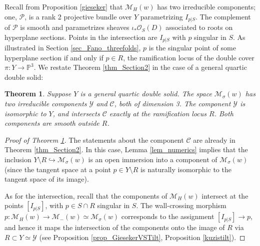 \documentclass[11pt]{amsart}
\newtheorem{thm}{Theorem}[section]
\theoremstyle{definition}
\newcommand{\pr}[1]{\mathbb P^{#1}}
\newcommand{\sO}{\mathcal{O}}
\newcommand{\sY}{\mathcal{Y}}
\newcommand{\sM}{\mathcal{M}}
\newcommand{\sC}{\mathcal{C}}
\newcommand{\AAA}[1]{\textcolor{red}{#1}}
\begin{document}
Recall from Proposition \ref{gieseker} that $\sM_H(w)$ has two irreducible components; one, $\mathcal P$, is a rank 2 projective bundle over $Y$ parametrizing $I_{p|S}$. The complement of $\mathcal P$ is smooth and parametrizes sheaves $\iota_*\sO_S(D)$ associated to roots on hyperplane sections. Points in the intersection are $I_{p|S}$ with $p$ singular in $S$. As illustrated in Section \ref{sec_Fano_threefolds}, $p$ is the singular point of some hyperplane section if and only if $p\in R$, the ramification locus of the double cover $\pi\colon Y\to \pr 3$.
We restate Theorem \ref{thm_Section2} in the case of a general quartic double solid: 

\begin{thm}\label{thm_moduliY2}
Suppose $Y$ is a general quartic double solid. The space $\mathcal{M}_\sigma(w)$ has two irreducible components $\sY$ and $\sC$, both of dimension 3. The component $\mathcal{Y}$ is isomorphic to $Y$, and intersects $\sC$ exactly at the ramification locus $R$. Both components are smooth outside $R$.
\end{thm}

\begin{proof}[Proof of Theorem \ref{thm_moduliY2}]
The statements about the component $\sC$ are already in Theorem \ref{thm_Section2}. In this case, Lemma \ref{lem_numerics} implies that the inclusion $Y \setminus R \hookrightarrow \sM_\sigma(w)$ is an open immersion into a component of $\sM_\sigma(w)$ (since the tangent space at a point $p\in Y\setminus R$ is naturally isomorphic to the tangent space of its image). 

As for the intersection, recall that the components of $\sM_H(w)$ intersect at the points $[I_{p|S}]$, with $p\in S\cap R$ singular in $S$. The wall-crossing morphism $p\colon \sM_H(w)\to \sM_-(w)\simeq \sM_\sigma(w)$ corresponds to the assignment $[I_{p|S}]\to p$, and hence it maps the intersection of the components onto the image of $R$ via $R\subset Y\simeq \mathcal Y$ (see Proposition \ref{prop_GiesekerVSTilt}, Proposition \ref{kuzistilt}). \end{proof}
\end{document}
